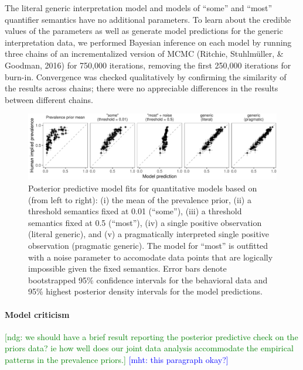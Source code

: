 \documentclass[floatsintext,doc]{apa6}
\let\oldparagraph\paragraph
\renewcommand{\paragraph}[1]{\oldparagraph{#1}\mbox{}}
\begin{document}
The literal generic interpretation model and models of \enquote{some} and \enquote{most} quantifier semantics have no additional parameters.
To learn about the credible values of the parameters as well as generate model predictions for the generic interpretation data, we performed Bayesian inference on each model by running three chains of an incrementalized version of MCMC (Ritchie, Stuhlmüller, \& Goodman, 2016) for 750,000 iterations, removing the first 250,000 iterations for burn-in.
Convergence was checked qualitatively by confirming the similarity of the results across chains; there were no appreciable differences in the results between different chains.



\begin{figure}
\centering
\includegraphics{genint_files/figure-latex/genint-modelingResults-1.pdf}
\caption{\label{fig:genint-modelingResults}Posterior predictive model fits for quantitative models based on (from left to right): (i) the mean of the prevalence prior, (ii) a threshold semantics fixed at 0.01 (\enquote{some}), (iii) a threshold semantics fixed at 0.5 (\enquote{most}), (iv) a single positive observation (literal generic), and (v) a pragmatically interpreted single positive observation (pragmatic generic). The model for \enquote{most} is outfitted with a noise parameter to accomodate data points that are logically impossible given the fixed semantics. Error bars denote bootstrapped 95\% confidence intervals for the behavioral data and 95\% highest posterior density intervals for the model predictions.}
\end{figure}

\hypertarget{model-criticism}{%
\paragraph{Model criticism}\label{model-criticism}}

{\textcolor{Green}{[ndg: we should have a brief result reporting the posterior predictive check on the priors data? ie how well does our joint data analysis accommodate the empirical patterns in the prevalence priors.]}}
{\textcolor{Blue}{[mht: this paragraph okay?]}}
\end{document}
